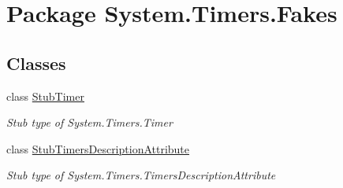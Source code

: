 \hypertarget{namespace_system_1_1_timers_1_1_fakes}{\section{Package System.\-Timers.\-Fakes}
\label{namespace_system_1_1_timers_1_1_fakes}
}
\subsection*{Classes}
\begin{DoxyCompactItemize}
\item 
class \hyperlink{class_system_1_1_timers_1_1_fakes_1_1_stub_timer}{Stub\-Timer}
\begin{DoxyCompactList}\small\item\em Stub type of System.\-Timers.\-Timer\end{DoxyCompactList}\item 
class \hyperlink{class_system_1_1_timers_1_1_fakes_1_1_stub_timers_description_attribute}{Stub\-Timers\-Description\-Attribute}
\begin{DoxyCompactList}\small\item\em Stub type of System.\-Timers.\-Timers\-Description\-Attribute\end{DoxyCompactList}\end{DoxyCompactItemize}
